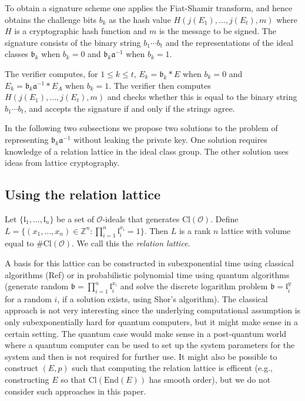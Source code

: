 \documentclass{llncs}
\newcommand{\OO}{\mathcal{O}}
\newcommand{\Z}{\mathbb{Z}}
\newcommand{\End}{\text{End}}
\newcommand{\Cl}{\text{Cl}}
\renewcommand{\a}{\mathfrak{a}}
\renewcommand{\b}{\mathfrak{b}}
\renewcommand{\l}{\mathfrak{l}}
\begin{document}
To obtain a signature scheme one applies the Fiat-Shamir transform, and hence obtains the challenge bits $b_k$ as the hash value $H( j(E_1), \dots, j(E_t) , m )$ where $H$ is a cryptographic hash function and $m$ is the message to be signed.
The signature consists of the binary string $b_1\cdots b_t$ and the representations of the ideal classes $\b_k$ when $b_k = 0$ and $\b_k \a^{-1}$ when $b_k = 1$.

The verifier computes, for $1 \le k \le t$, $E_k = \b_k * E$ when $b_k = 0$ and $E_k = \b_k \a^{-1} * E_A$ when $b_k = 1$. The verifier then computes $H( j( E_1), \dots, j(E_t), m )$ and checks whether this is equal to the binary string $b_1\cdots b_t$, and accepts the signature if and only if the strings agree.

In the following two subsections we propose two solutions to the problem of representing $\b_k \a^{-1}$ without leaking the private key. One solution requires knowledge of a relation lattice in the ideal class group. The other solution uses ideas from lattice cryptography.

\subsection{Using the relation lattice}

Let $\{ \l_1, \dots, \l_n \}$ be a set of $\OO$-ideals that generates $\Cl( \OO )$.
Define $L = \{ (x_1, \dots, x_n ) \in \Z^n : \prod_{i=1}^n \l_i^{x_i} = 1 \}$.
Then $L$ is a rank $n$ lattice with volume equal to $\#\Cl(\OO)$.
We call this the \emph{relation lattice}.

A basis for this lattice can be constructed in subexponential time using classical algorithms (Ref) or in probabilistic polynomial time using quantum algorithms (generate random $\b = \prod_{i=1}^n \l_i^{x_i} $ and solve the discrete logarithm problem $\b = \l_i^{y}$ for a random $i$, if a solution exists, using Shor's algorithm).
The classical approach is not very interesting since the underlying computational assumption is only subexponentially hard for quantum computers, but it might make sense in a certain setting.
The quantum case would make sense in a post-quantum world where a quantum computer can be used to set up the system parameters for the system and then is not required for further use.
It might also be possible to construct $(E, p )$ such that computing the relation lattice is efficent (e.g., constructing $E$ so that $\Cl( \End(E))$ has smooth order), but we do not consider such approaches in this paper.
\end{document}
